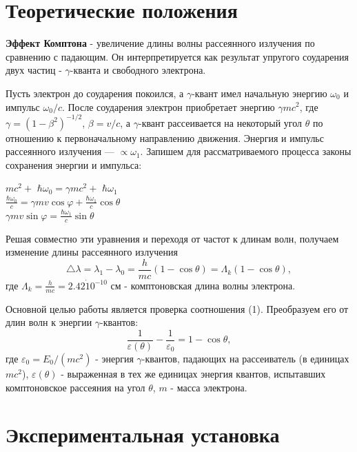 \documentclass[a4paper]{article}
\begin{document}
\section{Теоретические положения}
\textbf{Эффект Комптона} - увеличение длины волны рассеянного излучения по сравнению с падающим. Он интерпретируется как результат упругого соударения двух частиц - $\gamma$-кванта и свободного электрона. \par
Пусть электрон до соударения покоился, а  $\gamma$-квант имел начальную энергию \hbar$\omega_0$ и импульс \hbar$\omega_0/c$. После соударения электрон приобретает энергию $\gamma mc^2$, где $\gamma = (1 − \beta^2)^{−1/2}$, $\beta = v/c$, а  $\gamma$-квант рассеивается на некоторый угол $\theta$ по отношению
к первоначальному направлению движения. Энергия и импульс рассеянного излучения — $\propto \omega_1$. Запишем для рассматриваемого процесса законы сохранения энергии и импульса:
\begin{center}
    $mc^2 +$ $\hbar \omega_0 = \gamma mc^2 +$ $\hbar \omega_1$\\
    $\frac{\hbar \omega_0}{c} = \gamma mv \cos \varphi + \frac{\hbar \omega_1}{c} \cos \theta$ \\
    $\gamma mv \sin \varphi = \frac{\hbar \omega_1}{c} \sin \theta$
\end{center}
Решая совместно эти уравнения и переходя от частот к длинам волн, получаем изменение длины рассеянного излучения
\begin{equation}
    \triangle \lambda = \lambda_1 - \lambda_0 = \frac{h}{mc}(1 - \cos \theta) = \Lambda_k(1 - \cos \theta),
\end{equation}
где $\Lambda_k = \frac{h}{mc} = 2.42 \dot 10^{-10}$ см - комптоновская длина волны электрона. \par
Основной целью работы является проверка соотношения (1). Преобразуем его от длин волн к энергии $\gamma$-квантов:
\begin{equation}
    \frac{1}{\varepsilon(\theta)} - \frac{1}{\varepsilon_0} = 1 - \cos \theta,
\end{equation}
где $\varepsilon_0 = E_0/(mc^2)$ - энергия $\gamma$-квантов, падающих на рассеиватель (в единицах $mc^2$), $\varepsilon(\theta)$ - выраженная в тех же единицах энергия квантов, испытавших комптоновское рассеяния на угол $\theta$, $m$ - масса электрона.

\section{Экспериментальная установка}
\end{document}
